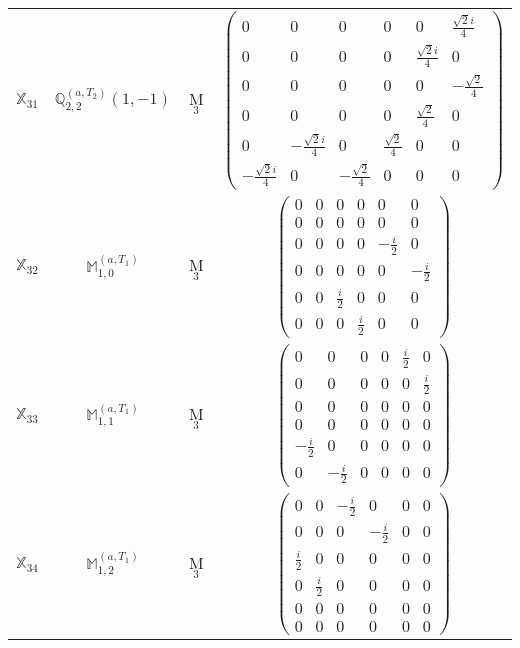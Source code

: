 \documentclass[fleqn,10pt,landscape]{article}
\begin{document}
\begin{itemize}
\begin{center}
\begin{longtable}{c|c|c|c}
$ \mathbb{X}_{31} $ & $\mathbb{Q}_{2,2}^{(a,T_{2})}(1,-1)$ & M$_{3}$ & $\begin{pmatrix} 0 & 0 & 0 & 0 & 0 & \frac{\sqrt{2} i}{4} \\ 0 & 0 & 0 & 0 & \frac{\sqrt{2} i}{4} & 0 \\ 0 & 0 & 0 & 0 & 0 & - \frac{\sqrt{2}}{4} \\ 0 & 0 & 0 & 0 & \frac{\sqrt{2}}{4} & 0 \\ 0 & - \frac{\sqrt{2} i}{4} & 0 & \frac{\sqrt{2}}{4} & 0 & 0 \\ - \frac{\sqrt{2} i}{4} & 0 & - \frac{\sqrt{2}}{4} & 0 & 0 & 0 \end{pmatrix}$ \\
$ \mathbb{X}_{32} $ & $\mathbb{M}_{1,0}^{(a,T_{1})}$ & M$_{3}$ & $\begin{pmatrix} 0 & 0 & 0 & 0 & 0 & 0 \\ 0 & 0 & 0 & 0 & 0 & 0 \\ 0 & 0 & 0 & 0 & - \frac{i}{2} & 0 \\ 0 & 0 & 0 & 0 & 0 & - \frac{i}{2} \\ 0 & 0 & \frac{i}{2} & 0 & 0 & 0 \\ 0 & 0 & 0 & \frac{i}{2} & 0 & 0 \end{pmatrix}$ \\
$ \mathbb{X}_{33} $ & $\mathbb{M}_{1,1}^{(a,T_{1})}$ & M$_{3}$ & $\begin{pmatrix} 0 & 0 & 0 & 0 & \frac{i}{2} & 0 \\ 0 & 0 & 0 & 0 & 0 & \frac{i}{2} \\ 0 & 0 & 0 & 0 & 0 & 0 \\ 0 & 0 & 0 & 0 & 0 & 0 \\ - \frac{i}{2} & 0 & 0 & 0 & 0 & 0 \\ 0 & - \frac{i}{2} & 0 & 0 & 0 & 0 \end{pmatrix}$ \\
$ \mathbb{X}_{34} $ & $\mathbb{M}_{1,2}^{(a,T_{1})}$ & M$_{3}$ & $\begin{pmatrix} 0 & 0 & - \frac{i}{2} & 0 & 0 & 0 \\ 0 & 0 & 0 & - \frac{i}{2} & 0 & 0 \\ \frac{i}{2} & 0 & 0 & 0 & 0 & 0 \\ 0 & \frac{i}{2} & 0 & 0 & 0 & 0 \\ 0 & 0 & 0 & 0 & 0 & 0 \\ 0 & 0 & 0 & 0 & 0 & 0 \end{pmatrix}$ \\

\end{longtable}
\end{center}
\end{itemize}
\end{document}
